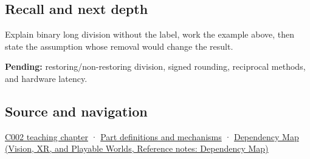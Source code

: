 \subsection{Recall and next depth}\label{appendix-89985e6a2685-recall-and-next-depth}

Explain binary long division without the label, work the example above, then state the assumption whose removal would change the result.

\textbf{Pending:} restoring/non-restoring division, signed rounding, reciprocal methods, and hardware latency.

\subsection{Source and navigation}\label{appendix-89985e6a2685-source-and-navigation}

\hyperref[01-foundations-i-ch001-arithmetic-becomes-a-policy]{C002 teaching chapter} · \hyperref[appendix-fd090d982a15]{Part definitions and mechanisms} · \href{../07-Vision-XR-and-Playable-Worlds/main.pdf\#nameddest=appendix-4ad47bdd269a}{Dependency Map (Vision, XR, and Playable Worlds, Reference notes: Dependency Map)}
